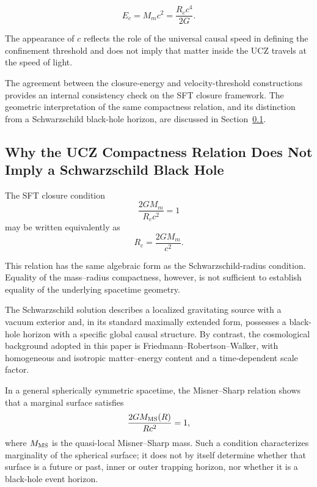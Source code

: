 \documentclass[12pt]{article}
\begin{document}
\begin{equation}
E_c
=
M_m c^2
=
\frac{R_c c^4}{2G}.
\label{eq:closure_energy_from_velocity}
\end{equation}

The appearance of \(c\) reflects the role of the universal causal
speed in defining the confinement threshold and does not imply that
matter inside the UCZ travels at the speed of light.

The agreement between the closure-energy and velocity-threshold
constructions provides an internal consistency check on the SFT
closure framework. The geometric interpretation of the same
compactness relation, and its distinction from a Schwarzschild
black-hole horizon, are discussed in
Section~\ref{subsec:ucz_not_black_hole}.

\subsection{Why the UCZ Compactness Relation Does Not Imply a Schwarzschild Black Hole}
\label{subsec:ucz_not_black_hole}

The SFT closure condition
\begin{equation}
\frac{2GM_m}{R_c c^2}=1
\label{eq:ucz_compactness_repeat}
\end{equation}
may be written equivalently as
\begin{equation}
R_c=\frac{2GM_m}{c^2}.
\end{equation}

This relation has the same algebraic form as the Schwarzschild-radius
condition. Equality of the mass--radius compactness, however, is not
sufficient to establish equality of the underlying spacetime
geometry.

The Schwarzschild solution describes a localized gravitating source
with a vacuum exterior and, in its standard maximally extended form,
possesses a black-hole horizon with a specific global causal
structure. By contrast, the cosmological background adopted in this
paper is Friedmann--Robertson--Walker, with homogeneous and isotropic
matter--energy content and a time-dependent scale factor.

In a general spherically symmetric spacetime, the Misner--Sharp
relation shows that a marginal surface satisfies
\begin{equation}
\frac{2GM_{\rm MS}(R)}{Rc^2}=1,
\end{equation}
where $M_{\rm MS}$ is the quasi-local Misner--Sharp mass. Such a
condition characterizes marginality of the spherical surface; it does
not by itself determine whether that surface is a future or past,
inner or outer trapping horizon, nor whether it is a black-hole event
horizon.
\end{document}
